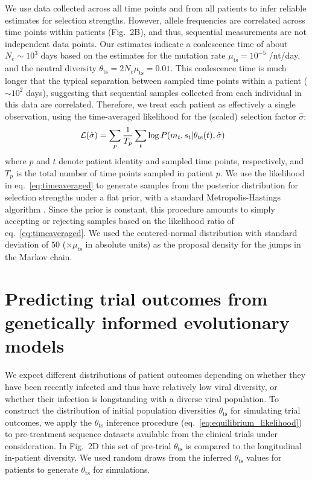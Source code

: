 \documentclass[11pt]{article}
\renewcommand{\paragraph}[2][.]{\noindent {\bf #2#1}}
\newcommand{\ts}{{\text{ts}}}
\begin{document}
We use data collected across all time points and from all patients to infer reliable estimates for selection strengths. However, allele frequencies are correlated across time points within patients (Fig.~2B), and thus, sequential measurements are not independent data points.
Our estimates indicate a coalescence time of about $N_e\sim10^3$ days based on the estimates for the mutation rate  $\mu_\ts = 10^{-5}$ /nt/day, and the neutral diversity $\theta_\ts =  2 N_e  \mu_\ts=0.01 $. This coalescence time is much longer that the typical separation between sampled time points within a patient ($\sim 10^2$ days), suggesting that   sequential samples collected from  each individual in this data are correlated.  
Therefore, we treat each patient as effectively a single observation, using the time-averaged likelihood for the (scaled) selection factor $\hat \sigma$:
 \begin{align}
 \label{eq:timeaveraged}
{\cal L }(\hat{\sigma}) &= 
	\sum_{p} \frac{1}{T_p} \sum_t \log P(m_t, s_t |\theta_{\ts}(t), \hat{\sigma})
\end{align}
where $p$ and $t$ denote patient identity and sampled time points, respectively, and $T_p$ is the total number of time points sampled in patient $p$. We use  the likelihood in eq.~\ref{eq:timeaveraged} to generate samples from the posterior distribution for selection strengths under a flat prior, with a standard Metropolis-Hastings algorithm \cite{hastingsMonteCarloSampling1970a}.  Since the prior is constant, this procedure amounts to simply accepting or rejecting samples based on the likelihood ratio of eq.~\ref{eq:timeaveraged}.
We used the centered-normal distribution with standard deviation of $50$ ($\times \mu_\ts$ in absolute units) as the proposal density for the jumps in the Markov chain.

\section{Predicting trial outcomes from genetically informed evolutionary models}

\paragraph{Predicting rebound times}
 We expect different distributions of patient outcomes depending on whether they have been recently infected and thus have relatively low viral diversity, or whether their infection is longstanding with a diverse viral population. To construct the distribution of initial population diversities $\theta_{\ts}$ for simulating trial outcomes, we apply the $\theta_{\ts}$ inference procedure (eq.~\ref{eq:equilibrium_likelihood}) to pre-treatment sequence datasets available from the clinical trials under consideration.
In Fig.~2D this set of pre-trial $\theta_\ts$ is compared to the longitudinal in-patient diversity.
We used random draws from the inferred $\theta_\ts$ values for patients to generate $\theta_\ts$ for simulations. 
\end{document}
